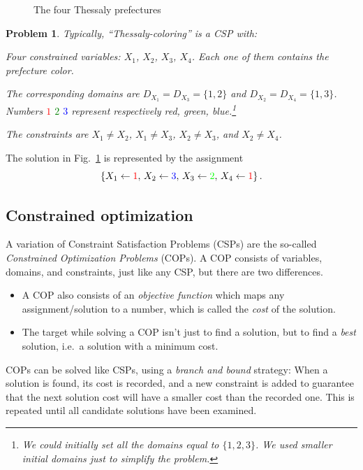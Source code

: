 \documentclass{ws-ijait}
\newtheorem{problem}{Problem}
\begin{document}
\begin{figure}
  \centering
  
  \caption{The four Thessaly prefectures\label{map-colored}}
\end{figure}

\begin{problem}
  \label{thessaly-coloring}
  Typically, \emph{``Thessaly-coloring''} is a CSP with:
  \begin{romanlist}
    \item Four constrained variables: $X_1$, $X_2$, $X_3$,
          $X_4$. Each one of them contains the prefecture
          color.
    \item The corresponding domains are $D_{X_1} = D_{X_3} =
          \{1, 2\}$ and $D_{X_2} = D_{X_4} = \{1, 3\}$.
          Numbers \textcolor{red}{$1$}
          \textcolor{green}{$2$} \textcolor{blue}{$3$}
          represent respectively red, green,
          blue.\footnote{We could initially set all the
          domains equal to $\{1, 2, 3\}$. We used smaller
          initial domains just to simplify the problem.}
    \item The constraints are $X_1 \neq X_2$, $X_1 \neq
          X_3$, $X_2 \neq X_3$, and $X_2 \neq X_4$.
  \end{romanlist}
\end{problem}
The solution in Fig.~\ref{map-colored} is represented by the
assignment
\begin{equation}
  \label{solution}
  \{X_1 \gets \textcolor{red}{1}, \, X_2 \gets
  \textcolor{blue}{3}, \, X_3 \gets \textcolor{green}{2}, \,
  X_4 \gets \textcolor{red}{1}\} \, .
\end{equation}

\subsection{Constrained optimization}

A variation of Constraint Satisfaction Problems (CSPs) are
the so-called \emph{Constrained Optimization Problems}
(COPs). A COP consists of variables, domains, and
constraints, just like any CSP, but there are two
differences.
\begin{itemize}
  \item A COP also consists of an \emph{objective function}
        which maps any assignment\slash solution to a
        number, which is called the \emph{cost} of the
        solution.
  \item The target while solving a COP isn't just to find a
        solution, but to find a \emph{best} solution, i.e.\ 
        a solution with a minimum cost.
\end{itemize}
COPs can be solved like CSPs, using a \emph{branch and
bound} strategy: When a solution is found, its cost is
recorded, and a new constraint is added to guarantee that
the next solution cost will have a smaller cost than the
recorded one. This is repeated until all candidate solutions
have been examined.
\end{document}
